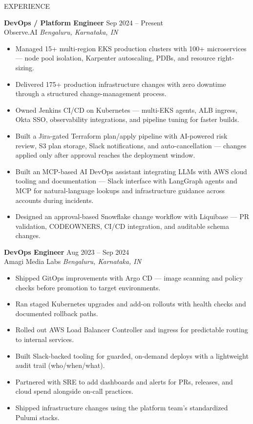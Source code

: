 \documentclass{resume} %
\begin{document}
\begin{rSection}{EXPERIENCE}

\textbf{DevOps / Platform Engineer} \hfill Sep 2024 -- Present\\
Observe.AI \hfill \textit{Bengaluru, Karnataka, IN}

\begin{itemize}
    \itemsep -3pt {} 
    \item Managed 15+ multi-region EKS production clusters with 100+ microservices --- node pool isolation, Karpenter autoscaling, PDBs, and resource right-sizing.
    \item Delivered 175+ production infrastructure changes with zero downtime through a structured change-management process.
    \item Owned Jenkins CI/CD on Kubernetes --- multi-EKS agents, ALB ingress, Okta SSO, observability integrations, and pipeline tuning for faster builds.
    \item Built a Jira-gated Terraform plan/apply pipeline with AI-powered risk review, S3 plan storage, Slack notifications, and auto-cancellation --- changes applied only after approval reaches the deployment window.
    \item Built an MCP-based AI DevOps assistant integrating LLMs with AWS cloud tooling and documentation --- Slack interface with LangGraph agents and MCP for natural-language lookups and infrastructure guidance across accounts during incidents.
    \item Designed an approval-based Snowflake change workflow with Liquibase --- PR validation, CODEOWNERS, CI/CD integration, and auditable schema changes.
\end{itemize}


 
\textbf{DevOps Engineer} \hfill Aug 2023 -- Sep 2024\\
Amagi Media Labs \hfill \textit{Bengaluru, Karnataka, IN}

\begin{itemize}
    \itemsep -3pt {} 
    \item Shipped GitOps improvements with Argo CD --- image scanning and policy checks before promotion to target environments.
    \item Ran staged Kubernetes upgrades and add-on rollouts with health checks and documented rollback paths.
    \item Rolled out AWS Load Balancer Controller and ingress for predictable routing to internal services.
    \item Built Slack-backed tooling for guarded, on-demand deploys with a lightweight audit trail (who/when/what).
    \item Partnered with SRE to add dashboards and alerts for PRs, releases, and cloud spend alongside on-call practices.
    \item Shipped infrastructure changes using the platform team's standardized Pulumi stacks.
\end{itemize}


\end{rSection}
\end{document}
